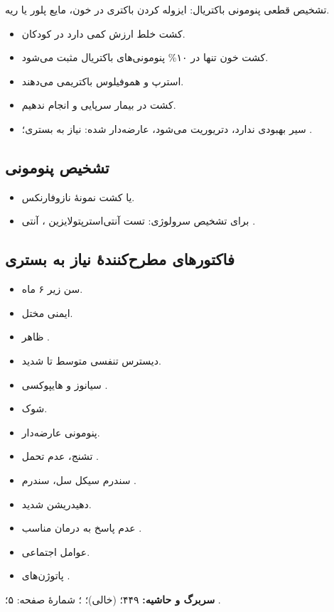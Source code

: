 \documentclass[12pt,a4paper]{article}
\begin{document}
تشخیص قطعی پنومونی باکتریال: ایزوله کردن باکتری در خون، مایع پلور یا ریه.
\begin{itemize}
\item کشت خلط ارزش کمی دارد در کودکان.
\item کشت خون تنها در ۱۰\% پنومونی‌های باکتریال مثبت می‌شود.
\item استرپ  و هموفیلوس باکتریمی می‌دهند.
\item کشت در بیمار سرپایی و  انجام ندهیم.
\item سیر بهبودی ندارد، دتریوریت می‌شود، عارضه‌دار شده: نیاز به بستری؛ . 
\end{itemize}
\subsection*{تشخیص پنومونی}
\begin{itemize}
\item {} یا کشت نمونهٔ نازوفارنکس.
\item برای تشخیص  سرولوژی: تست آنتی‌استرپتولایزین ، آنتی .
\end{itemize}
\subsection*{فاکتورهای مطرح‌کنندهٔ نیاز به بستری}
\begin{itemize}
\item سن زیر ۶ ماه.
\item ایمنی مختل.
\item ظاهر .
\item دیسترس تنفسی متوسط تا شدید.
\item سیانوز و هایپوکسی .
\item شوک.
\item پنومونی عارضه‌دار.
\item تشنج، عدم تحمل .
\item سندرم سیکل سل، سندرم .
\item دهیدریشن شدید.
\item عدم پاسخ به درمان مناسب .
\item عوامل اجتماعی.
\item پاتوژن‌های .
\end{itemize}

\textbf{سربرگ و حاشیه:} ۴۴۹؛  (خالی)؛ ؛ شمارهٔ صفحه: ۵؛ .
\end{document}
